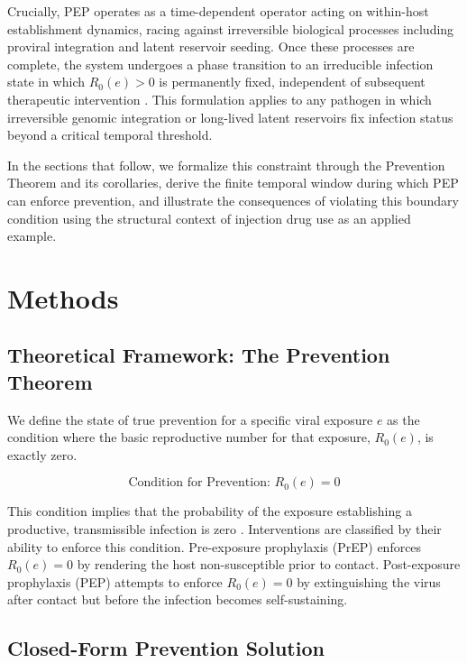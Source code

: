 \documentclass[12pt]{article}
\begin{document}
Crucially, PEP operates as a time-dependent operator acting on within-host establishment dynamics, racing against irreversible biological processes including proviral integration and latent reservoir seeding. Once these processes are complete, the system undergoes a phase transition to an irreducible infection state in which $R_0(e)>0$ is permanently fixed, independent of subsequent therapeutic intervention \cite{mcmichael_immune_2010, wahl_hiv_2023, siliciano_enhanced_2015}. This formulation applies to any pathogen in which irreversible genomic integration or long-lived latent reservoirs fix infection status beyond a critical temporal threshold.

In the sections that follow, we formalize this constraint through the Prevention Theorem and its corollaries, derive the finite temporal window during which PEP can enforce prevention, and illustrate the consequences of violating this boundary condition using the structural context of injection drug use as an applied example.

\section{Methods}

\subsection{Theoretical Framework: The Prevention Theorem}

We define the state of true prevention for a specific viral exposure $e$ as the condition where the basic reproductive number for that exposure, $R_0(e)$, is exactly zero.

\begin{equation}
\text{Condition for Prevention: } R_0(e) = 0
\end{equation}

This condition implies that the probability of the exposure establishing a productive, transmissible infection is zero \cite{greenhalgh_mathematical_1997, liang_stochastic_2016}. Interventions are classified by their ability to enforce this condition. Pre-exposure prophylaxis (PrEP) enforces $R_0(e) = 0$ by rendering the host non-susceptible prior to contact. Post-exposure prophylaxis (PEP) attempts to enforce $R_0(e) = 0$ by extinguishing the virus after contact but before the infection becomes self-sustaining.

\subsection{Closed-Form Prevention Solution}
\end{document}
